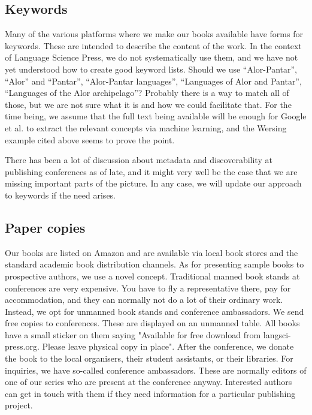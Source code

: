 \documentclass[nonflat,smallfont
]{langsci/langscibook}
\begin{document}
\subsection{Keywords }
Many of the various platforms where we make our books available have forms for keywords. These are intended to describe the content of the work. In the context of Language Science Press, we do not systematically use them, and we have not yet understood how to create good keyword lists. Should we use ``Alor-Pantar'', ``Alor'' and ``Pantar'', ``Alor-Pantar languages'', ``Languages of Alor and Pantar'', ``Languages of the Alor archipelago''? Probably there is a way to match all of those, but we are not sure what it is and how we could facilitate that. For the time being, we assume that the full text being available will be enough for Google et al. to extract the relevant concepts via machine learning, and the Wersing example cited above seems to prove the point. 

There has been a lot of discussion about metadata and discoverability at publishing conferences as of late, and it might very well be the case that we are missing important parts of the picture. In any case, we will update our approach to keywords if the need arises.
                    
\subsection{Paper copies}                    
Our books are listed on Amazon and are available via local book stores and the standard academic book distribution channels. As for presenting sample books to prospective authors, we use a novel concept. Traditional manned book stands at conferences are very expensive. You have to fly a representative there, pay for accommodation, and they can normally not do a lot of their ordinary work. Instead, we opt for unmanned book stands and conference ambassadors. We send free copies to conferences.  These are displayed on an unmanned table. All books have a small sticker on them saying "Available for free download from langsci-press.org. Please leave physical copy in place". After the conference, we donate the book to the local organisers, their student assistants, or their libraries. 
For inquiries, we have so-called conference ambassadors. These are normally editors of one of our series who are present at the conference anyway. Interested authors can get in touch with them if they need information for a particular publishing project. 
                    
\end{document}
